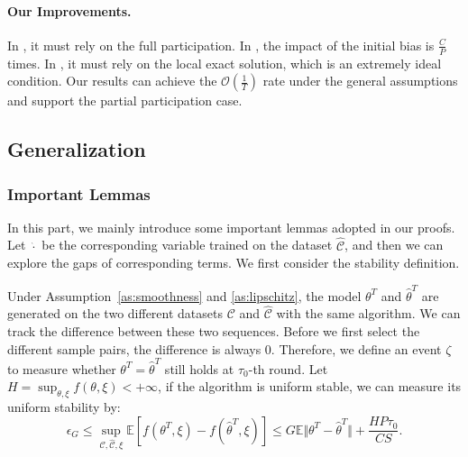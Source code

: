 \paragraph{Our Improvements.} In \citep{zhang2021fedpd}, it must rely on the full participation. In \citep{gong2022fedadmm,wang2022fedadmm}, the impact of the initial bias is $\frac{C}{P}$ times. In \citep{durmus2021federated}, it must rely on the local exact solution, which is an extremely ideal condition. Our results can achieve the $\mathcal{O}(\frac{1}{T})$ rate under the general assumptions and support the partial participation case.


\subsection{Generalization}
\subsubsection{Important Lemmas}
\label{ap:important lemmas}
In this part, we mainly introduce some important lemmas adopted in our proofs. Let $\hat{\cdot}$ be the corresponding variable trained on the dataset $\hat{\mathcal{C}}$, and then we can explore the gaps of corresponding terms. We first consider the stability definition.
\begin{lemma}
\label{ap:lemma:stability}
Under Assumption~\ref{as:smoothness} and \ref{as:lipschitz}, the model $\theta^T$ and $\hat{\theta}^T$ are generated on the two different datasets $\mathcal{C}$ and $\hat{\mathcal{C}}$ with the same algorithm. We can track the difference between these two sequences. Before we first select the different sample pairs, the difference is always $0$. Therefore, we define an event $\zeta$ to measure whether $\theta^T=\hat{\theta}^T$ still holds at $\tau_0$-th round. Let $H=\sup_{\theta,\xi}f(\theta,\xi)<+\infty$, if the algorithm is uniform stable, we can measure its uniform stability by:
\begin{equation}
    \epsilon_G \leq \sup_{\mathcal{C}, \hat{\mathcal{C}},\xi}\mathbb{E}\left[f(\theta^T,\xi) - f(\hat{\theta}^T,\xi)\right] \leq G\mathbb{E}\Vert \theta^T - \hat{\theta}^T\Vert + \frac{HP\tau_0}{CS}.
\end{equation}
\end{lemma}
